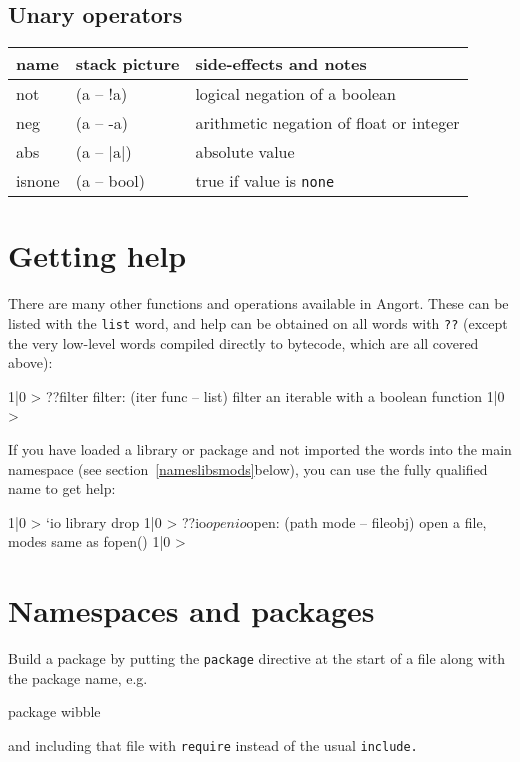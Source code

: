 \subsection{Unary operators}
\begin{center}
\begin{tabular}{|l|l|p{4in}|}\hline
\textbf{name} & \textbf{stack picture} & \textbf{side-effects and notes}\\ \hline
not & (a -- !a) & logical negation of a boolean\\
neg & (a -- -a) & arithmetic negation of float or integer\\
abs & (a -- $|\textrm{a}|$) & absolute value\\
isnone & (a -- bool) & true if value is \texttt{none} \\
\hline
\end{tabular}
\end{center}

\section{Getting help}
There are many other functions and operations available in Angort.
These can be listed with the \texttt{list} word, and help can
be obtained on all words with \texttt{??} (except the very low-level words compiled
directly to bytecode, which are all covered above):
\begin{v}
1|0 > ??filter
filter: (iter func -- list) filter an iterable with a boolean function
1|0 > 
\end{v}
If you have loaded a library or package and not imported the words
into the main namespace (see section~\ref{nameslibsmods}below), you
can use the fully qualified name to get help:
\begin{v}
1|0 > `io library drop
1|0 > ??io$open
io$open: (path mode -- fileobj) open a file, modes same as fopen()
1|0 > 
\end{v}


\section{Namespaces and packages}
Build a package by putting the \texttt{package} directive at the start
of a file along with the package name, e.g.
\begin{v}
package wibble
\end{v}

and including that file with \texttt{require} instead of the usual \texttt{include.} 


